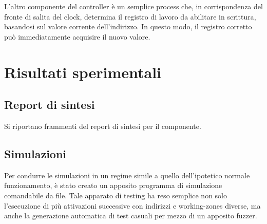 \documentclass[11pt,a4paper]{article}
\begin{document}
L'altro componente del controller è un semplice process che, in corrispondenza del fronte di salita del clock, determina il registro di lavoro da abilitare
in scrittura, basandosi sul valore corrente dell'indirizzo. In questo modo, il registro corretto può immediatamente acquisire il nuovo valore.

\section{Risultati sperimentali}

\subsection{Report di sintesi}
Si riportano frammenti del report di sintesi per il componente.


\begin{minipage}{\linewidth}
    
\end{minipage}

\begin{minipage}{\linewidth}
    
\end{minipage}

\begin{minipage}{\linewidth}
    
\end{minipage}

\subsection{Simulazioni}
Per condurre le simulazioni in un regime simile a quello dell'ipotetico normale funzionamento, è stato creato un apposito programma di simulazione
comandabile da file. Tale apparato di testing ha reso semplice non solo l'esecuzione di più attivazioni successive con indirizzi e working-zones diverse, 
ma anche la generazione automatica di test casuali per mezzo di un apposito fuzzer.
\end{document}

